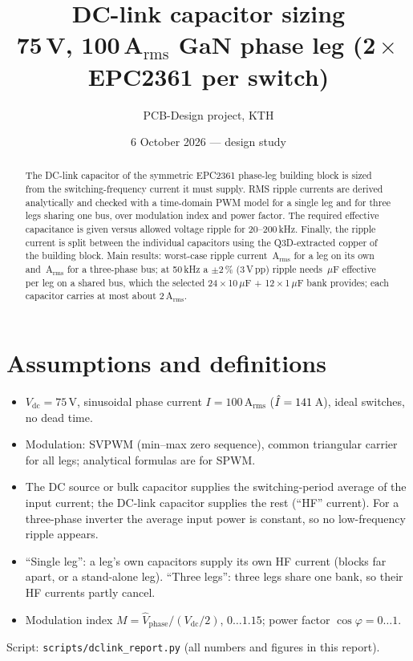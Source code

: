 ﻿\documentclass[10pt,a4paper]{article}
\title{DC-link capacitor sizing\\[2pt]\large 75\,V, 100\,A$_\mathrm{rms}$ GaN phase leg (2\,$\times$\,EPC2361 per switch)}
\author{PCB-Design project, KTH}
\date{6 October 2026 --- design study}
\newcommand{\uF}{\ensuremath{\mu}F}
\begin{document}
\maketitle

\begin{abstract}
The DC-link capacitor of the symmetric EPC2361 phase-leg building block is sized from the switching-frequency current it must supply.
RMS ripple currents are derived analytically and checked with a time-domain PWM model for a single leg and for three legs sharing one bus, over modulation index and power factor.
The required effective capacitance is given versus allowed voltage ripple for 20--200\,kHz.
Finally, the ripple current is split between the individual capacitors using the Q3D-extracted copper of the building block.
Main results: worst-case ripple current \IlegWorst\,A$_\mathrm{rms}$ for a leg on its own and \ItotWorst\,A$_\mathrm{rms}$ for a three-phase bus; at 50\,kHz a $\pm$2\,\% (3\,V\,pp) ripple needs \CBlockFiftyThree\,\uF{} effective per leg on a shared bus, which the selected 24\,$\times$\,10\,\uF{} + 12\,$\times$\,1\,\uF{} bank provides; each capacitor carries at most about 2\,A$_\mathrm{rms}$.
\end{abstract}

\section{Assumptions and definitions}
\begin{itemize}\itemsep0pt
\item $V_\mathrm{dc}=75$\,V, sinusoidal phase current $I=100$\,A$_\mathrm{rms}$ ($\hat I=141$\,A), ideal switches, no dead time.
\item Modulation: SVPWM (min--max zero sequence), common triangular carrier for all legs; analytical formulas are for SPWM.
\item The DC source or bulk capacitor supplies the switching-period average of the input current; the DC-link capacitor supplies the rest (``HF'' current). For a three-phase inverter the average input power is constant, so no low-frequency ripple appears.
\item ``Single leg'': a leg's own capacitors supply its own HF current (blocks far apart, or a stand-alone leg). ``Three legs'': three legs share one bank, so their HF currents partly cancel.
\item Modulation index $M = \hat V_\mathrm{phase}/(V_\mathrm{dc}/2)$, $0\dots1.15$; power factor $\cos\varphi = 0\dots1$.
\end{itemize}
Script: \texttt{scripts/dclink\_report.py} (all numbers and figures in this report).
\end{document}
